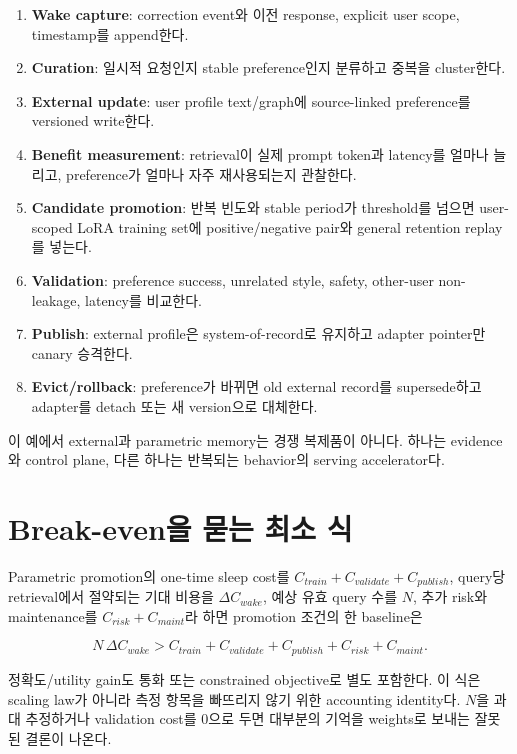 \begin{enumerate}
  \item \textbf{Wake capture}: correction event와 이전 response, explicit user scope, timestamp를 append한다.
  \item \textbf{Curation}: 일시적 요청인지 stable preference인지 분류하고 중복을 cluster한다.
  \item \textbf{External update}: user profile text/graph에 source-linked preference를 versioned write한다.
  \item \textbf{Benefit measurement}: retrieval이 실제 prompt token과 latency를 얼마나 늘리고, preference가
        얼마나 자주 재사용되는지 관찰한다.
  \item \textbf{Candidate promotion}: 반복 빈도와 stable period가 threshold를 넘으면 user-scoped LoRA
        training set에 positive/negative pair와 general retention replay를 넣는다.
  \item \textbf{Validation}: preference success, unrelated style, safety, other-user non-leakage, latency를 비교한다.
  \item \textbf{Publish}: external profile은 system-of-record로 유지하고 adapter pointer만 canary 승격한다.
  \item \textbf{Evict/rollback}: preference가 바뀌면 old external record를 supersede하고 adapter를 detach 또는
        새 version으로 대체한다.
\end{enumerate}

이 예에서 external과 parametric memory는 경쟁 복제품이 아니다. 하나는 evidence와 control plane,
다른 하나는 반복되는 behavior의 serving accelerator다.

\section{Break-even을 묻는 최소 식}

Parametric promotion의 one-time sleep cost를 $C_{train}+C_{validate}+C_{publish}$, query당 retrieval에서
절약되는 기대 비용을 $\Delta C_{wake}$, 예상 유효 query 수를 $N$, 추가 risk와 maintenance를
$C_{risk}+C_{maint}$라 하면 promotion 조건의 한 baseline은

\begin{equation}
N\,\Delta C_{wake} > C_{train}+C_{validate}+C_{publish}+C_{risk}+C_{maint}.
\end{equation}

정확도/utility gain도 통화 또는 constrained objective로 별도 포함한다. 이 식은 scaling law가 아니라
측정 항목을 빠뜨리지 않기 위한 accounting identity다. $N$을 과대 추정하거나 validation cost를 0으로
두면 대부분의 기억을 weights로 보내는 잘못된 결론이 나온다.

